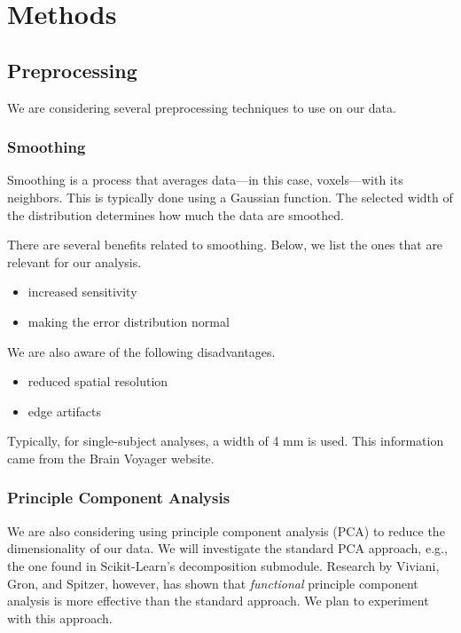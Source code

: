 \documentclass[11pt]{article}
\begin{document}
\section{Methods}

\subsection{Preprocessing}

We are considering several preprocessing techniques to use on our data.

\subsubsection{Smoothing}

Smoothing is a process that averages data---in this case, voxels---with its
neighbors. This is typically done using a Gaussian function. The selected width
of the distribution determines how much the data are smoothed.

There are several benefits related to smoothing. Below, we list the ones that
are relevant for our analysis.

\begin{itemize}
  \item increased sensitivity
  \item making the error distribution normal
\end{itemize}

We are also aware of the following disadvantages.

\begin{itemize}
  \item{reduced spatial resolution}
  \item{edge artifacts}
\end{itemize}

Typically, for single-subject analyses, a width of 4 mm is used. This
information came from the Brain Voyager website\cite{bvsmoothing}.

\subsubsection{Principle Component Analysis}

We are also considering using principle component analysis (PCA) to reduce the
dimensionality of our data. We will investigate the standard PCA approach,
e.g., the one found in Scikit-Learn's decomposition submodule. Research by
Viviani, Gron, and Spitzer\cite{viviani}, however, has shown that
\textit{functional} principle component analysis is more effective than the
standard approach. We plan to experiment with this approach.
\end{document}
